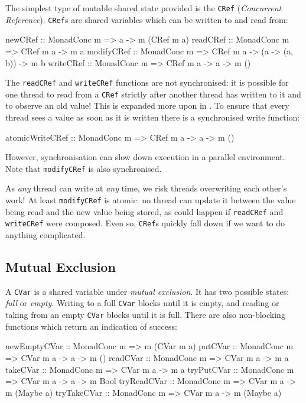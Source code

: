 The simplest type of mutable shared state provided is the \verb|CRef|
(\emph{Concurrent Reference}). \verb|CRef|s are shared variables which
can be written to and read from:

\begin{haskellcode}
newCRef    :: MonadConc m => a -> m (CRef m a)
readCRef   :: MonadConc m => CRef m a -> m a
modifyCRef :: MonadConc m => CRef m a -> (a -> (a, b)) -> m b
writeCRef  :: MonadConc m => CRef m a -> a -> m ()
\end{haskellcode}

The \verb|readCRef| and \verb|writeCRef| functions are not
synchronised: it is possible for one thread to read from a \verb|CRef|
strictly after another thread has written to it and to observe an old
value!  This is expanded more upon in . To
ensure that every thread sees a value as soon as it is written there
is a synchronised write function:

\begin{haskellcode}
atomicWriteCRef :: MonadConc m => CRef m a -> a -> m ()
\end{haskellcode}

However, synchronisation can slow down execution in a parallel
environment. Note that \verb|modifyCRef| is also synchronised.

As \emph{any} thread can write at \emph{any} time, we risk threads
overwriting each other's work! At least \verb|modifyCRef| is atomic:
no thread can update it between the value being read and the new value
being stored, as could happen if \verb|readCRef| and \verb|writeCRef|
were composed. Even so, \verb|CRef|s quickly fall down if we want to
do anything complicated.

\subsection{Mutual Exclusion}
\label{sec:abstraction-typeclass-cvars}

A \verb|CVar| is a shared variable under \emph{mutual exclusion}. It
has two possible states: \emph{full} or \emph{empty}. Writing to a
full \verb|CVar| blocks until it is empty, and reading or taking from
an empty \verb|CVar| blocks until it is full. There are also
non-blocking functions which return an indication of success:

\begin{haskellcode}
newEmptyCVar :: MonadConc m => m (CVar m a)
putCVar      :: MonadConc m => CVar m a -> a -> m ()
readCVar     :: MonadConc m => CVar m a -> m a
takeCVar     :: MonadConc m => CVar m a -> m a
tryPutCVar   :: MonadConc m => CVar m a -> a -> m Bool
tryReadCVar  :: MonadConc m => CVar m a -> m (Maybe a)
tryTakeCVar  :: MonadConc m => CVar m a -> m (Maybe a)
\end{haskellcode}

